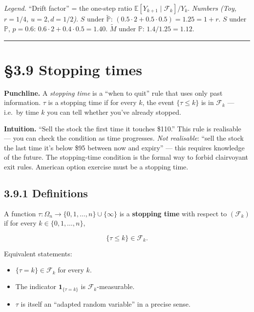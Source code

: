 \documentclass[
  10pt,
  twoside]{book}
\providecommand{\tightlist}{%
  \setlength{\itemsep}{0pt}\setlength{\parskip}{0pt}}
\begin{document}
\emph{Legend.} ``Drift factor'' = the one-step ratio
\(\mathbb E[Y_{k+1}\mid\mathcal F_k]/Y_k\). \emph{Numbers (Toy,
\(r=1/4\), \(u=2, d=1/2\)).} \(S\) under \(\tilde{\mathbb P}\):
\((0.5\cdot 2 + 0.5\cdot 0.5) = 1.25 = 1+r\). \(S\) under \(\mathbb P\),
\(p=0.6\): \(0.6\cdot 2 + 0.4\cdot 0.5 = 1.40\). \(\widetilde M\) under
\(\mathbb P\): \(1.4/1.25 = 1.12\).

\begin{center}\rule{0.5\linewidth}{0.5pt}\end{center}

\section{§3.9 Stopping times}\label{stopping-times}

\textbf{Punchline.} A \emph{stopping time} is a ``when to quit'' rule
that uses only past information. \(\tau\) is a stopping time if for
every \(k\), the event \(\{\tau \le k\}\) is in \(\mathcal F_k\) ---
i.e.~by time \(k\) you can tell whether you've already stopped.

\textbf{Intuition.} ``Sell the stock the first time it touches \$110.''
This rule is realisable --- you can check the condition as time
progresses. \emph{Not realisable}: ``sell the stock the last time it's
below \$95 between now and expiry'' --- this requires knowledge of the
future. The stopping-time condition is the formal way to forbid
clairvoyant exit rules. American option exercise must be a stopping
time.

\subsection{3.9.1 Definitions}\label{definitions-12}

A function \(\tau : \Omega_n \to \{0, 1, \ldots, n\} \cup \{\infty\}\)
is a \textbf{stopping time} with respect to \((\mathcal F_k)\) if for
every \(k \in \{0, 1, \ldots, n\}\),

\[\{\tau \le k\} \in \mathcal F_k.\]

Equivalent statements:

\begin{itemize}
\tightlist
\item
  \(\{\tau = k\} \in \mathcal F_k\) for every \(k\).
\item
  The indicator \(\mathbf 1_{\{\tau = k\}}\) is
  \(\mathcal F_k\)-measurable.
\item
  \(\tau\) is itself an ``adapted random variable'' in a precise sense.
\end{itemize}
\end{document}
